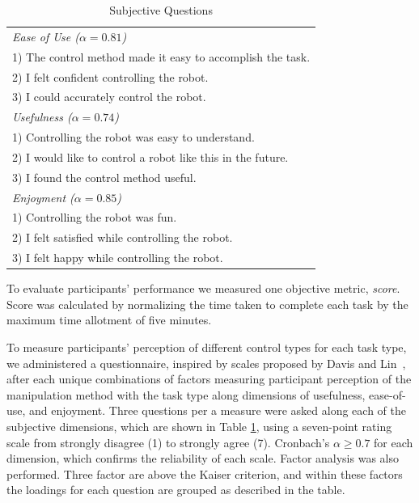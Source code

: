 \documentclass{sigchi}
\begin{document}
 \begin{table}[t]
\centering
\caption{Subjective Questions}
\begin{tabular}{|p{\columnwidth}|}
\hline
\em{Ease of Use} ($\alpha = 0.81$) \\
1) The control method made it easy to accomplish the task. \\
2) I felt confident controlling the robot. \\
3) I could accurately control the robot. \\
\hline
\em{Usefulness} ($\alpha = 0.74$) \\
1) Controlling the robot was easy to understand. \\
2) I would like to control a robot like this in the future. \\
3) I found the control method useful. \\
\hline
\em{Enjoyment} ($\alpha = 0.85$) \\
1) Controlling the robot was fun. \\
2) I felt satisfied while controlling the robot. \\
3) I felt happy while controlling the robot. \\
\hline
\end{tabular}
\label{tab:subjective}
 \end{table}

To evaluate participants' performance we measured one objective metric, \textit{score}. Score was calculated by normalizing the time taken to complete each task by the maximum time allotment of five minutes.

To measure participants' perception of different control types for each task type, we administered a questionnaire, inspired by scales proposed by Davis and Lin~\cite{Davis1989, Lin2008}, after each unique combinations of factors measuring participant perception of the manipulation method with the task type along dimensions of usefulness, ease-of-use, and enjoyment. Three questions per a measure were asked along each of the subjective dimensions, which are shown in Table \ref{tab:subjective}, using a seven-point rating scale from strongly disagree (1) to strongly agree (7). Cronbach's $\alpha\geq0.7$ for each dimension, which confirms the reliability of each scale. Factor analysis was also performed. Three factor are above the Kaiser criterion, and within these factors the loadings for each question are grouped as described in the table.

\end{document}
